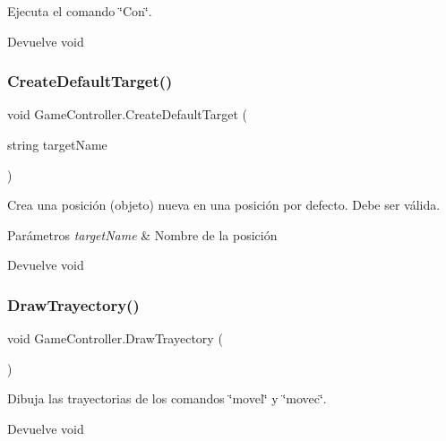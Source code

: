 Ejecuta el comando \char`\"{}\+Con\char`\"{}. \begin{DoxyReturn}{Devuelve}
void 
\end{DoxyReturn}
\mbox{\label{class_game_controller_a0f08cc86bd15fbe811ce9e54a83e67d9}} 
\subsubsection{\texorpdfstring{CreateDefaultTarget()}{CreateDefaultTarget()}}
{\footnotesize\ttfamily void Game\+Controller.\+Create\+Default\+Target (\begin{DoxyParamCaption}\item[{string}]{target\+Name }\end{DoxyParamCaption})\hspace{0.3cm}{\ttfamily [inline]}}

Crea una posición (objeto) nueva en una posición por defecto. Debe ser válida. 
\begin{DoxyParams}{Parámetros}
{\em target\+Name} & Nombre de la posición \\
\hline
\end{DoxyParams}
\begin{DoxyReturn}{Devuelve}
void 
\end{DoxyReturn}
\mbox{\label{class_game_controller_afd55aa0db0046a73a2b9bb57dc56d373}} 
\subsubsection{\texorpdfstring{DrawTrayectory()}{DrawTrayectory()}}
{\footnotesize\ttfamily void Game\+Controller.\+Draw\+Trayectory (\begin{DoxyParamCaption}{ }\end{DoxyParamCaption})\hspace{0.3cm}{\ttfamily [inline]}}

Dibuja las trayectorias de los comandos \char`\"{}movel\char`\"{} y \char`\"{}movec\char`\"{}. \begin{DoxyReturn}{Devuelve}
void 
\end{DoxyReturn}
\mbox{\label{class_game_controller_ac1dcb5c2f0422f5568ca776dd5cd7b7c}} 
